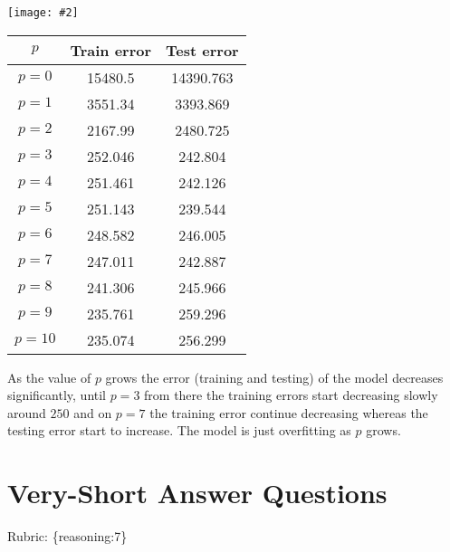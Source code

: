 \documentclass{article}
\def\rubric#1{\gre{Rubric: \{#1\}}}{}
\def\gre#1{{\color{gre}#1}}
\def\ans#1{{\color{ans}#1}}
\newcommand{\centerfig}[2]{\begin{center}\texttt{[image: \#2]}\end{center}}
\begin{document}
\centerfig{1}{../figs/least_squares_poly.pdf}
\ans{
    \scriptsize
    \setlength{\tabcolsep}{10pt}
    \begin{center}
    \begin{tabular}{SSS} \toprule
        {$p$} & {Train error} & {Test error} \\ \midrule
        {$p=0$} & 15480.5 & 14390.763 \\ 
        {$p=1$} & 3551.34 & 3393.869 \\ 
        {$p=2$} & 2167.99 & 2480.725 \\ 
        {$p=3$} & 252.046 & 242.804 \\ 
        {$p=4$} & 251.461 & 242.126 \\ 
        {$p=5$} & 251.143 & 239.544 \\ 
        {$p=6$} & 248.582 & 246.005 \\ 
        {$p=7$} & 247.011 & 242.887 \\ 
        {$p=8$} & 241.306 & 245.966 \\ 
        {$p=9$} & 235.761 & 259.296 \\ 
        {$p=10$} & 235.074 & 256.299 \\ \bottomrule
    \end{tabular}
    \end{center}
    \normalsize
    As the value of $p$ grows the error (training and testing) of the model decreases significantly, 
    until $p=3$ from there the training errors start decreasing slowly around $250$ and on $p=7$ 
    the training error continue decreasing whereas the testing error start to increase. The model is 
    just overfitting as $p$ grows.
}

\section{Very-Short Answer Questions}
\rubric{reasoning:7}
\end{document}
